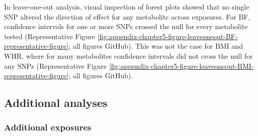 \documentclass[11pt,twoside]{bristolthesis}
\begin{document}
In leave-one-out analysis, visual inspection of forest plots showed that no single SNP altered the direction of effect for any metabolite across exposures. For BF, confidence intervals for one or more SNPs crossed the null for every metabolite tested (Representative Figure \ref{fig:appendix-chapter5-figure-leaveoneout-BF-representative-figure}; all figures GitHub). This was not the case for BMI and WHR, where for many metabolites confidence intervals did not cross the null for any SNPs (Representative Figure \ref{fig:appendix-chapter5-figure-leaveoneout-BMI-representative-figure}; all figures GitHub).

\hypertarget{additional-analyses-1}{%
\subsection{Additional analyses}\label{additional-analyses-1}}

\hypertarget{additional-exposures}{%
\subsubsection{Additional exposures}\label{additional-exposures}}
\end{document}
